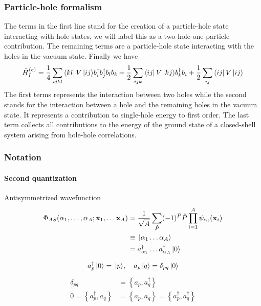 \frame
{
  \frametitle{Particle-hole formalism}
\begin{small}
{\scriptsize
The terms in the first line  stand for the creation of a particle-hole state 
interacting with hole states, we will label this as a two-hole-one-particle contribution. 
The remaining terms are a particle-hole state interacting with the holes in the vacuum state. 
Finally we have 
\begin{equation}
	\hat{H}_I^{(e)} = \frac{1}{4}
		 \sum_{ijkl}
		 \element{kl}{V}{ij}b_i^\dagger b_j^\dagger b_l b_k+
	        \frac{1}{2}\sum_{ijk}\element{ij}{V}{kj}b_k^\dagger b_i
	        +\frac{1}{2}\sum_{ij}\element{ij}{V}{ij}\label{eq:2-70d}
\end{equation}
The first terms represents the 
interaction between two holes while the second stands for the interaction between a hole and the remaining holes in the vacuum state.
It represents a contribution to single-hole energy  to first order.
The last term collects all contributions to the energy of the ground state of a closed-shell system arising
from hole-hole correlations.
}
\end{small}
}

%


%
\begin{frame}[fragile]
    \frametitle{Notation}
    \framesubtitle{Second quantization}
    \begin{block}{Antisymmetrized wavefunction}
    \begin{align*}
        \Phi_{AS}(\alpha_1, \dots, \alpha_A; \mathbf{x}_1, \dots \mathbf{x}_A) &= 
            \frac{1}{\sqrt{A}} \sum_{\hat{P}} (-1)^P \hat{P} \prod_{i=1}^A \psi_{\alpha_i}(\mathbf{x}_i) \\
        &\equiv \,|{\alpha_1 \dots \alpha_A}\rangle \\
        &= a_{\alpha_1}^\dagger \dots a_{\alpha_A}^\dagger \,|{0}\rangle
    \end{align*}
    \end{block}
    \begin{align*}
        a_p^\dagger\,|{0}\rangle = \,|{p}\rangle, \quad a_p \,|{q}\rangle = \delta_{pq}\,|{0}\rangle
    \end{align*}
    \begin{align*}
        \delta_{pq} &= \left\{a_p, a_q^\dagger \right\} \\
        0 = \left\{a_p^\dagger, a_q \right\} &= \left\{a_p, a_q \right\} = \left\{a_p^\dagger, a_q^\dagger \right\}
    \end{align*}
\end{frame}

